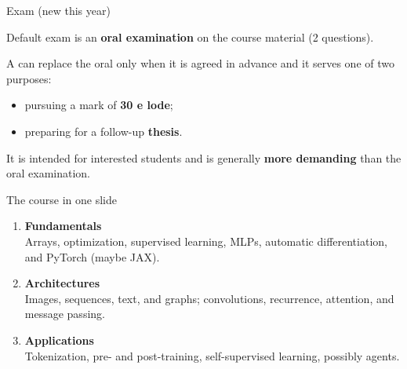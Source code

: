 \documentclass[14pt,aspectratio=169,notheorems]{beamer}
\begin{document}
\begin{frame}{Exam ({\color{yellow}new this year})}

	Default exam is an \textbf{oral examination} on the course material (2 questions).

	A  can replace the oral only when it is agreed in advance and it serves one of two purposes:

	\begin{itemize}
		\item pursuing a mark of \textbf{30 e lode};
		\item preparing for a follow-up \textbf{thesis}.
	\end{itemize}

	It is intended for interested students and is generally \textbf{more demanding} than the oral examination.

\end{frame}

\begin{frame}{The course in one slide}

	\begin{enumerate}
		\item \textbf{Fundamentals}\\
		      Arrays, optimization, supervised learning, MLPs, automatic differentiation, and PyTorch (maybe JAX).
		\item \textbf{Architectures}\\
		      Images, sequences, text, and graphs; convolutions, recurrence, attention, and message passing.
		\item \textbf{Applications}\\
		      Tokenization, pre- and post-training, self-supervised learning, possibly agents.
	\end{enumerate}

\end{frame}
\end{document}
